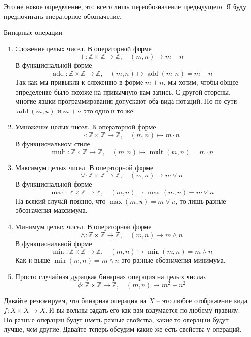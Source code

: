 Это не новое определение, это всего лишь переобозначение предыдущего.
Я буду предпочитать операторное обозначение.

\begin{examples}
Бинарные операции:
\begin{enumerate}
\item Сложение целых чисел.
В операторной форме
\[
+\colon \mathbb Z\times \mathbb Z\to \mathbb Z,\quad (m,n) \mapsto m + n
\]
В функциональной форме
\[
\operatorname{add}\colon \mathbb Z\times \mathbb Z\to \mathbb Z,\quad (m,n) \mapsto \operatorname{add}(m,n) = m+n
\]
Так как мы привыкли к сложению в форме $m + n$, мы хотим, чтобы общее определение было похоже на привычную нам запись.
С другой стороны, многие языки программирования допускают оба вида нотаций.
Но по сути $\operatorname{add}(m,n)$ и $m+n$ это одно и то же.

\item Умножение целых чисел.
В операторной форме
\[
\cdot\colon \mathbb Z\times \mathbb Z\to \mathbb Z,\quad (m,n) \mapsto m \cdot n
\]
В функциональном стиле
\[
\operatorname{mult}\colon \mathbb Z\times \mathbb Z\to \mathbb Z,\quad (m,n) \mapsto \operatorname{mult}(m,n) = m\cdot n
\]

\item Максимум целых чисел.
В операторной форме
\[
\vee\colon \mathbb Z\times \mathbb Z\to \mathbb Z,\quad (m,n) \mapsto m \vee n
\]
В функциональной форме
\[
\operatorname{max}\colon \mathbb Z\times \mathbb Z\to \mathbb Z,\quad (m,n) \mapsto \operatorname{max}(m,n) = m\vee n
\]
На всякий случай поясню, что $\max(m,n) = m \vee n$, то лишь разные обозначения максимума.

\item Минимум целых чисел.
В операторной форме
\[
\wedge\colon \mathbb Z\times \mathbb Z\to \mathbb Z,\quad (m,n) \mapsto m \wedge n
\]
В функциональной форме
\[
\operatorname{min}\colon \mathbb Z\times \mathbb Z\to \mathbb Z,\quad (m,n) \mapsto \operatorname{min}(m,n) = m\wedge n
\]
Как и выше $\min(m,n) = m \wedge n$ это разные обозначения минимума.

\item Просто случайная дурацкая бинарная операция на целых числах
\[
\phi\colon \mathbb Z\times \mathbb Z\to \mathbb Z,\quad (m,n)\mapsto m^2 - n^2
\]
\end{enumerate}
\end{examples}

Давайте резюмируем, что бинарная операция на $X$ -- это любое отображение вида $f\colon X\times X\to X$.
И вы вольны задать его как вам вздумается по любому правилу.
Но разные операции будут иметь разные свойства, какие-то операции будут лучше, чем другие.
Давайте теперь обсудим какие же есть свойства у операций.

